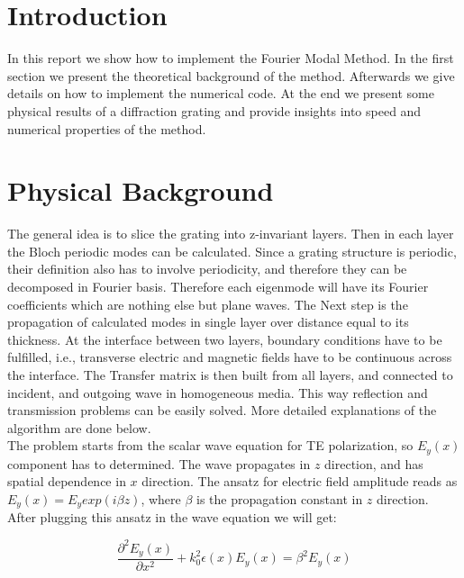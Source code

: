 \documentclass[a4paper,12pt]{scrartcl}
\title{\titel}
\author{\large{Felix \textsc{Wechsler}, Tymoteusz \textsc{Wrzeszcz}, Joshua \textsc{Jordaan}}\\  \large{Group 2}}
\date{\large{\today}}
\begin{document}
    \maketitle
	\thispagestyle{empty}
	\newpage
	\setcounter{page}{1}
	\tableofcontents

\newpage
\section{Introduction}
    In this report we show how to implement the Fourier Modal Method.
    In the first section we present the theoretical background of the method.
    Afterwards we give details on how to implement the numerical code.
    At the end we present some physical results of a diffraction grating and provide insights into speed 
    and numerical properties of the method.


\section{Physical Background}
    The general idea is to slice the grating into z-invariant layers. Then in each layer the Bloch periodic modes can be calculated. Since a grating structure is periodic, their definition also has to involve periodicity, and therefore they can be decomposed in Fourier basis. Therefore each eigenmode will have its Fourier coefficients which are nothing else but plane waves. The Next step is the propagation of calculated modes in single layer over distance equal to its thickness. At the interface between two layers, boundary conditions have to be fulfilled, i.e., transverse electric and magnetic fields have to be continuous across the interface. The Transfer matrix is then built from all layers, and connected to incident, and outgoing wave in homogeneous media. This way reflection and transmission problems can be easily solved. More detailed explanations of the algorithm are done below.\\
    
    
    The problem starts from the scalar wave equation for TE polarization, so $E_{y}(x)$ component has to determined. The wave propagates in $z$ direction, and has spatial dependence in $x$ direction. The ansatz for electric field amplitude reads as $E_{y}(x) = E_{y}exp(i\beta z)$, where $\beta$ is the propagation constant in $z$ direction. After plugging this ansatz in the wave equation we will get:
    
    \begin{equation}
        \frac{\partial^2 E_{y}(x)}{\partial x^2} + k_{0}^2\epsilon(x)E_{y}(x) = \beta^2E_{y}(x)
    \label{wave_eq}
    \end{equation}
    
\end{document}
